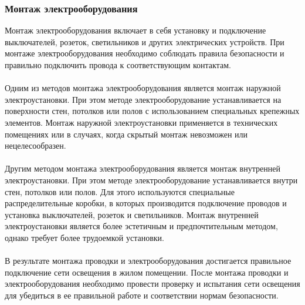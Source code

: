 \documentclass{article}
\begin{document}
\subsubsection{Монтаж электрооборудования}
Монтаж электрооборудования включает в себя установку и подключение выключателей, розеток, светильников и других электрических устройств. При монтаже электрооборудования необходимо соблюдать правила безопасности и правильно подключить провода к соответствующим контактам.\\
~\\
Одним из методов монтажа электрооборудования является монтаж наружной электроустановки. При этом методе электрооборудование устанавливается на поверхности стен, потолков или полов с использованием специальных крепежных элементов. Монтаж наружной электроустановки применяется в технических помещениях или в случаях, когда скрытый монтаж невозможен или нецелесообразен.\\
~\\
Другим методом монтажа электрооборудования является монтаж внутренней электроустановки. При этом методе электрооборудование устанавливается внутри стен, потолков или полов. Для этого используются специальные распределительные коробки, в которых производится подключение проводов и установка выключателей, розеток и светильников. Монтаж внутренней электроустановки является более эстетичным и предпочтительным методом, однако требует более трудоемкой установки.\\
~\\
В результате монтажа проводки и электрооборудования достигается правильное подключение сети освещения в жилом помещении. После монтажа проводки и электрооборудования необходимо провести проверку и испытания сети освещения для убедиться в ее правильной работе и соответствии нормам безопасности.\\
~\\

\newpage
\end{document}
